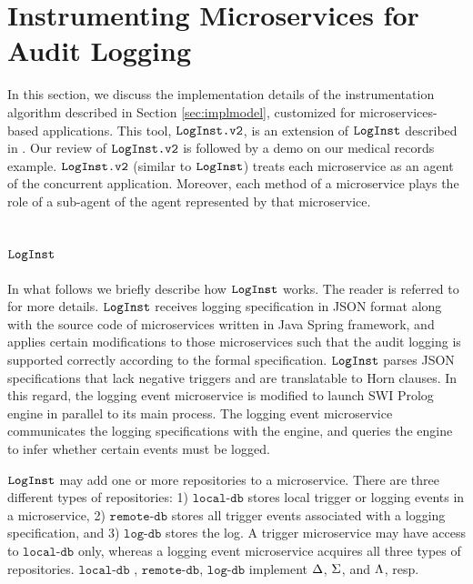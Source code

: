\section{Instrumenting Microservices for Audit Logging}\label{sec:impl}
In this section, we discuss the implementation details of the instrumentation algorithm described in Section \ref{sec:implmodel}, customized for microservices-based applications. This tool, $\texttt{LogInst.v2}$, is an extension of $\texttt{LogInst}$ described in \cite{}. Our review of $\texttt{LogInst.v2}$  is followed by a demo on our medical records example. $\texttt{LogInst.v2}$ (similar to $\texttt{LogInst}$) treats each microservice as an agent of the concurrent application. Moreover, each method of a microservice plays the role of a sub-agent of the agent represented by that microservice. 

\subsection{$\texttt{LogInst}$}
In what follows we briefly describe how $\texttt{LogInst}$ works. The reader is referred to \cite{} for more details. $\texttt{LogInst}$ receives logging specification in JSON format along with the source code of microservices written in Java Spring framework, and applies certain modifications to those microservices such that the audit logging is supported correctly according to the formal specification. $\texttt{LogInst}$ parses JSON specifications that lack negative triggers and are translatable to Horn clauses. In this regard, the logging event microservice is modified to launch SWI Prolog  \cite{} engine in parallel to its main process. The logging event microservice communicates the logging specifications with the engine, and queries the engine to infer whether certain events must be logged.

$\texttt{LogInst}$ may add one or more repositories to a microservice. There are three different types of repositories: 1) $\texttt{local-db}$ stores local trigger or logging events in a microservice, 2) $\texttt{remote-db}$ stores all trigger events associated with a logging specification, and 3) $\texttt{log-db}$ stores the log. A trigger microservice may have access to  $\texttt{local-db}$ only, whereas a logging event microservice acquires all three types of repositories. $\texttt{local-db}$ , $\texttt{remote-db}$, $\texttt{log-db}$ implement $\Delta$, $\Sigma$, and $\Lambda$, resp.

